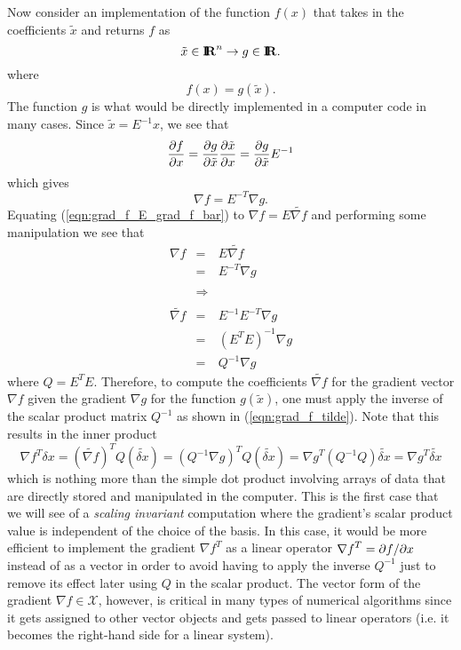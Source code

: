 \documentclass[pdf,ps2pdf,11pt]{SANDreport}
\begin{document}
Now consider an implementation of the function $f(x)$ that takes in the coefficients
$\tilde{x}$ and returns $f$ as
%
\[
\tilde{x}\in\mbox{\textbf{I}}\hspace{-0.6ex}\mbox{\textbf{R}}^n \rightarrow g\in\mbox{\textbf{I}}\hspace{-0.6ex}\mbox{\textbf{R}}.
\]
%
where
%
\[
f(x) = g(\tilde{x}).
\]
%
The function $g$ is what would be directly implemented in a computer code in
many cases.  Since $\tilde{x} = E^{-1} x$, we see that
%
\[
\displaystyle{\frac{\partial f}{\partial x}} = \displaystyle{\frac{\partial g}{\partial \tilde{x}}} \displaystyle{\frac{\partial \tilde{x}}{\partial x}}  = \displaystyle{\frac{\partial g}{\partial \tilde{x}}} E^{-1}
\]
%
which gives
%
\begin{equation}
\nabla f = E^{-T} \nabla g.
\label{eqn:grad_f_E_grad_f_bar}
\end{equation}
%
Equating (\ref{eqn:grad_f_E_grad_f_bar}) to $\nabla f = E {}\tilde{\nabla f}$
and performing some manipulation we see that
%
\begin{eqnarray}
\nabla f
& = & E \tilde{\nabla f} \nonumber \\
& = & E^{-T} \nabla g \nonumber \\
& & \nonumber \\
& \Rightarrow & \nonumber \\
& & \nonumber \\
\tilde{\nabla f}
& = & E^{-1} E^{-T} \nabla g \nonumber \\
& = & (E^T E)^{-1} \nabla g \nonumber \\
& = & {Q}^{-1} \nabla g
\label{eqn:grad_f_tilde}
\end{eqnarray}
%
where $Q = E^T E$.  Therefore, to compute the coefficients
$\tilde{\nabla f}$ for the gradient vector $\nabla f$ given the gradient
$\nabla g$ for the function $g(\tilde{x})$, one must apply the inverse of the
scalar product matrix $Q^{-1}$ as shown in
(\ref{eqn:grad_f_tilde}).  Note that this results in the inner product
%
\[
{\nabla f}^T \delta x = (\tilde{\nabla f})^T Q (\tilde{\delta x})
= ({Q}^{-1} {\nabla g})^T Q (\tilde{\delta x})
= {\nabla g}^T ( {Q}^{-1} Q ) \tilde{\delta x}
= {\nabla g}^T \tilde{\delta x}
\]
%
which is nothing more than the simple dot product involving arrays of data
that are directly stored and manipulated in the computer.  This is the first
case that we will see of a {}\textit{scaling invariant} computation where the
gradient's scalar product value is independent of the choice of the basis.  In
this case, it would be more efficient to implement the gradient ${\nabla f}^T$
as a linear operator ${\nabla f}^T = {}\partial f / \partial x$ instead of as a vector in
order to avoid having to apply the inverse ${Q}^{-1}$ just to remove its
effect later using $Q$ in the scalar product.  The vector form of the gradient
$\nabla f\in\mathcal{X}$, however, is critical in many types of numerical
algorithms since it gets assigned to other vector objects and gets passed to
linear operators (i.e. it becomes the right-hand side for a linear system).
\end{document}
